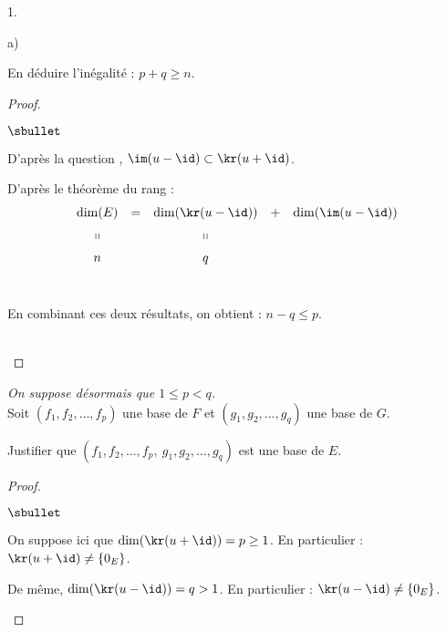 \documentclass[11pt]{article}%
\begin{document}
\begin{noliste}{1.}
\begin{noliste}{a)}
  \item En déduire l'inégalité : $p + q \geq n$.
    
    \begin{proof}~
      \begin{noliste}{$\sbullet$}
      \item D'après la question , $\im(u-\id) \subset \kr(u
        + \id)$.%

      \item D'après le théorème du rang :
	\[
        \begin{array}{ccccc}
          \dim(E) & = & \dim(\kr(u-\id)) & + & \dim(\im(u-\id))
          \\[.2cm]
          \shortparallel & & \shortparallel & & 
          \\[.2cm]
          n & & q & & 
        \end{array}        
	\]
	~

      \item En combinant ces deux résultats, on obtient : $n - q \leq
        p$.\\%
        ~\\[-1.4cm]
      \end{noliste}
    \end{proof}
    {\it On suppose désormais que $1\leq p<q$.}\\
    Soit $(f_1, f_2, \ldots, f_p)$ une base de $F$ et $(g_1, g_2,
    \ldots, g_q)$ une base de $G$.

  \item Justifier que $(f_1, f_2, \hdots, f_p, \ g_1,g_2,\hdots,g_q)$
    est une base de $E$.
    
    \begin{proof}~%
      \begin{noliste}{$\sbullet$}
      \item On suppose ici que $\dim(\kr(u + \id)) = p \geq 1$. En
        particulier : $\kr(u + \id) \neq \{ 0_E \}$.%

      \item De même, $\dim(\kr(u - \id)) = q > 1$. En particulier :
        $\kr(u - \id) \neq \{ 0_E \}$.%



\end{noliste}
\end{proof}
\end{noliste}
\end{noliste}
\end{document}
